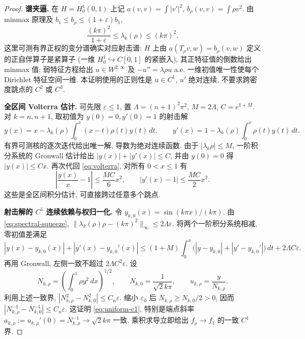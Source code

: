 \documentclass[UTF8]{ctexart}
\begin{document}
\begin{proof}
\textbf{谱夹逼.} 在 $H=H_0^1(0,1)$ 上记
$a(v,v)=\int|v'|^2$, $b_\rho(v,v)=\int\rho v^2$.
由 minmax 原理及 $b_1\le b_\rho\le(1+\varepsilon)b_1$,
\begin{equation}\label{eq:spectral-squeeze}
\frac{(k\pi)^2}{1+\varepsilon}\le\lambda_k(\rho)\le(k\pi)^2.
\end{equation}
这里可测有界正权的变分谱确实对应射击谱: $H$ 上由
$a(T_\rho v,w)=b_\rho(v,w)$ 定义的正自伴算子是紧算子
(一维 $H_0^1\hookrightarrow C[0,1]$ 的紧嵌入), 其正特征值的倒数给出
minmax 值; 弱特征方程给出 $u\in W^{2,\infty}$ 及 $-u''=\lambda\rho u$ a.e.
一维初值唯一性使每个 Dirichlet 特征空间一维. 本证明使用的正则性是
$u\in C^1$, $u'$ 绝对连续, 不要求跨密度跳点的 $C^2$ 或 $C^3$.

\textbf{全区间 Volterra 估计.} 可先限 $\varepsilon\le1$,
置 $\Lambda=(n+1)^2\pi^2$, $M=2\Lambda$, $C=e^{1+M}$.
对 $k=n,n+1$, 取初值为 $y(0)=0,y'(0)=1$ 的射击解
\begin{equation}\label{eq:volterra}
y(x)=x-\lambda_k(\rho)\int_0^x(x-t)\rho(t)y(t)\,dt,\qquad
y'(x)=1-\lambda_k(\rho)\int_0^x\rho(t)y(t)\,dt.
\end{equation}
有界可测核的逐次迭代给出唯一解, 导数为绝对连续函数.
由于 $|\lambda_k\rho|\le M$, 一阶积分系统的 Gronwall 估计给出
$|y(x)|+|y'(x)|\le C$, 并由 $y(0)=0$ 得 $|y(x)|\le Cx$.
再次代回 \eqref{eq:volterra}, 对所有 $0<x\le1$ 有
\begin{equation}\label{eq:volterra-remainder}
\left|\frac{y(x)}x-1\right|\le\frac{MC}{6}x^2,\qquad
|y'(x)-1|\le\frac{MC}{2}x^2.
\end{equation}
这些是全区间积分估计, 可直接跨过任意多个跳点.

\textbf{射击解的 $C^1$ 连续依赖与权归一化.}
令 $y_{k,0}(x)=\sin(k\pi x)/(k\pi)$.
由 \eqref{eq:spectral-squeeze},
$\|\lambda_k(\rho)\rho-(k\pi)^2\|_\infty\le2\Lambda\varepsilon$.
将两个一阶积分系统相减, 零初值差满足
\begin{equation*}
|y(x)-y_{k,0}(x)|+|y'(x)-y_{k,0}'(x)|
\le(1+M)\int_0^x\bigl(|y-y_{k,0}|+|y'-y_{k,0}'|\bigr)\,dt
+2\Lambda C\varepsilon.
\end{equation*}
再用 Gronwall, 左侧一致不超过 $2\Lambda C^2\varepsilon$.
设
\begin{equation*}
N_{k,\rho}=\left(\int_0^1\rho y^2\,dx\right)^{1/2},\qquad
N_{k,0}=\frac1{\sqrt2 k\pi},\qquad u_{k,\rho}=\frac{y}{N_{k,\rho}}.
\end{equation*}
利用上述一致界,
$|N_{k,\rho}^2-N_{k,0}^2|\le C_n\varepsilon$.
缩小 $\varepsilon_0$ 后 $N_{k,\rho}\ge N_{k,0}/2>0$, 因而
$|N_{k,\rho}^{-1}-N_{k,0}^{-1}|\le C_n\varepsilon$.
这证明 \eqref{eq:uniform-c1}, 特别是端点斜率
$a_{k,\rho}:=u_{k,\rho}'(0)=N_{k,\rho}^{-1}\to\sqrt2 k\pi$ 一致.
乘积求导立即给出 $f_\rho\to f_1$ 的一致 $C^1$ 界.


\end{proof}
\end{document}
